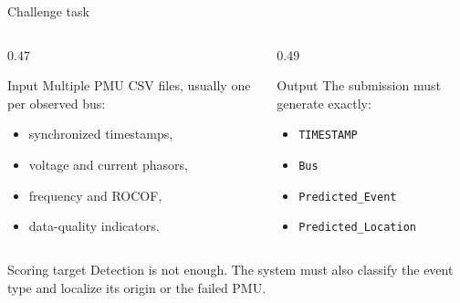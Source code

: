 \documentclass[10pt,aspectratio=169]{beamer}
\newcommand{\code}[1]{\texttt{\footnotesize #1}}
\begin{document}
\begin{frame}{Challenge task}
\small
\begin{columns}[T,totalwidth=\textwidth]
\begin{column}{0.47\textwidth}
\begin{block}{Input}
Multiple PMU CSV files, usually one per observed bus:
\begin{itemize}
  \item synchronized timestamps,
  \item voltage and current phasors,
  \item frequency and ROCOF,
  \item data-quality indicators.
\end{itemize}
\end{block}
\end{column}
\begin{column}{0.49\textwidth}
\begin{alertblock}{Output}
The submission must generate exactly:
\begin{itemize}
  \item \code{TIMESTAMP}
  \item \code{Bus}
  \item \code{Predicted\_Event}
  \item \code{Predicted\_Location}
\end{itemize}
\end{alertblock}
\end{column}
\end{columns}
\vspace{2mm}
\begin{exampleblock}{Scoring target}
Detection is not enough. The system must also classify the event type and localize its origin or the failed PMU.
\end{exampleblock}
\end{frame}
\end{document}
